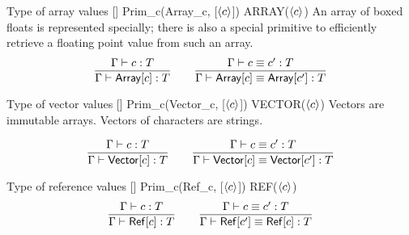 \documentclass[12pt,twoside,fleqn]{article}
\begin{document}
  {Type of array values}
  {[\constructor]}
  {Prim\_c(Array\_c, [$\langle{c}\rangle$])}
  {ARRAY($\langle{c}\rangle$)}
  {An array of boxed floats is represented specially; there is also
   a special primitive to efficiently retrieve a floating point value
   from such an array.}
  {\[\frac
    {\Gamma\vdash c : T}
    {\Gamma\vdash \mathsf{Array}[c] : T}
   \qquad
   \frac
    {\Gamma\vdash c \equiv c' : T}
    {\Gamma\vdash \mathsf{Array}[c] \equiv \mathsf{Array}[c'] : T}
  \]}   


  {Type of vector values}
  {[\constructor]}
  {Prim\_c(Vector\_c, [$\langle{c}\rangle$])}
  {VECTOR($\langle{c}\rangle$)}
  {Vectors are immutable arrays.  Vectors of characters are strings.}\par
  {\[\frac
    {\Gamma\vdash c : T}
    {\Gamma\vdash \mathsf{Vector}[c] : T}
   \qquad
   \frac
    {\Gamma\vdash c \equiv c' : T}
    {\Gamma\vdash \mathsf{Vector}[c] \equiv \mathsf{Vector}[c'] : T}
  \]}

  {Type of reference values}
  {[\constructor]}
  {Prim\_c(Ref\_c, [$\langle{c}\rangle$])}
  {REF($\langle{c}\rangle$)}
  {}
  {\[\frac
    {\Gamma\vdash c : T}
    {\Gamma\vdash \mathsf{Ref}[c] : T}
   \qquad
   \frac
    {\Gamma\vdash c \equiv c' : T}
    {\Gamma\vdash \mathsf{Ref}[c'] \equiv \mathsf{Ref}[c] : T}
  \]}
\end{document}
